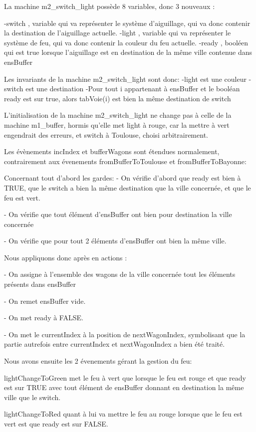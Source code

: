 La machine m2\_switch\_light possède 8 variables, donc 3 nouveaux :

-switch , variable qui va représenter le système d'aiguillage, qui va donc contenir la destination de l'aiguillage actuelle.
-light  , variable qui va représenter le système de feu, qui va donc contenir la couleur du feu actuelle.
-ready  , booléen qui est true lorsque l'aiguillage est en destination de la même ville contenue dans ensBuffer

Les invariants de la machine m2\_switch\_light sont donc:
    -light est une couleur
    -switch est une destination
    -Pour tout i appartenant à ensBuffer et le booléan ready est sur true, alors tabVoie(i) est bien la même destination de switch

L'initialisation de la machine m2\_switch\_light ne change pas à celle de la machine m1\_buffer, hormis qu'elle met light à rouge, car la mettre à vert engendrait des erreurs, et switch à Toulouse, choisi arbitrairement.

Les évènements incIndex et bufferWagons sont étendues normalement, contrairement aux évenements fromBufferToToulouse et fromBufferToBayonne:

Concernant tout d'abord les gardes:
- On vérifie d'abord que ready est bien à TRUE, que le switch a bien la même destination que la ville concernée, et que le feu est vert.

- On vérifie que tout élément d'ensBuffer ont bien pour destination la ville concernée

- On vérifie que pour tout 2  éléments d'ensBuffer ont bien la même ville.

Nous appliquons donc après en actions :

- On assigne à l'ensemble des wagons de la ville concernée tout les éléments présents dans ensBuffer

- On remet ensBuffer vide.

- On met ready à FALSE.

- On met le currentIndex à la position de nextWagonIndex, symbolisant que la partie autrefois entre currentIndex et nextWagonIndex a bien été traité.

Nous avons ensuite les 2 évenements gérant la gestion du feu:

lightChangeToGreen met le feu à vert que lorsque le feu est rouge et que ready est sur TRUE avec tout élément de ensBuffer donnant en destination la même ville que le switch.

lightChangeToRed quant à lui va mettre le feu au rouge lorsque que le feu est vert est que ready est sur FALSE.

